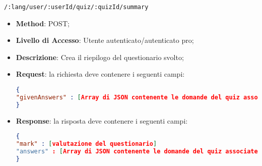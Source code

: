 	
	\item \texttt{/:lang/user/:userId/quiz/:quizId/summary}
	\begin{itemize}
		\item \textbf{Method}: POST;
		\item \textbf{Livello di Accesso}: Utente autenticato/autenticato pro;
		\item \textbf{Descrizione}: Crea il riepilogo del questionario svolto;
		\item \textbf{Request}: la richiesta deve contenere i seguenti campi:
\begin{lstlisting}[language=json,firstnumber=1]
{
"givenAnswers" : [Array di JSON contenente le domande del quiz associate alle risposte date dall'utente]
}
\end{lstlisting}
		\item \textbf{Response}: la risposta deve contenere i seguenti campi:
\begin{lstlisting}[language=json,firstnumber=1]
{
"mark" : [valutazione del questionario]
"answers" : [Array di JSON contenente le domande del quiz associate alle risposte date dall'utente e le risposte corrette]
}
\end{lstlisting}
	\end{itemize}